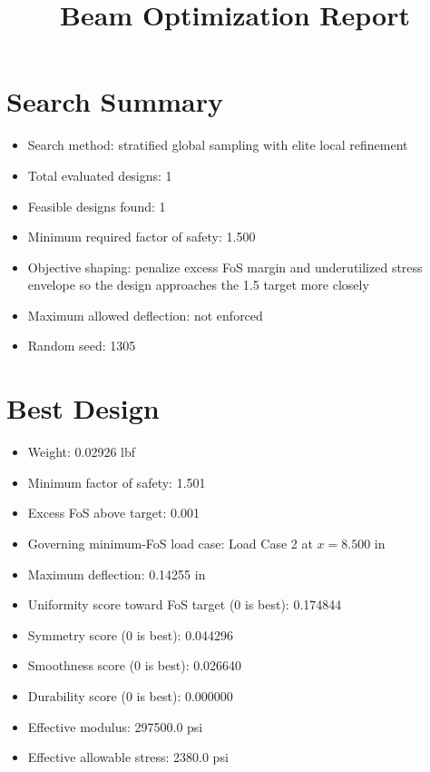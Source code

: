 \documentclass[11pt]{article}
\title{Beam Optimization Report}
\date{}
\begin{document}
\maketitle

\section*{Search Summary}
\begin{itemize}
\item Search method: stratified global sampling with elite local refinement
\item Total evaluated designs: 1
\item Feasible designs found: 1
\item Minimum required factor of safety: 1.500
\item Objective shaping: penalize excess FoS margin and underutilized stress envelope so the design approaches the 1.5 target more closely
\item Maximum allowed deflection: not enforced
\item Random seed: 1305
\end{itemize}

\section*{Best Design}
\begin{itemize}
\item Weight: 0.02926 lbf
\item Minimum factor of safety: 1.501
\item Excess FoS above target: 0.001
\item Governing minimum-FoS load case: Load Case 2 at $x=8.500$ in
\item Maximum deflection: 0.14255 in
\item Uniformity score toward FoS target (0 is best): 0.174844
\item Symmetry score (0 is best): 0.044296
\item Smoothness score (0 is best): 0.026640
\item Durability score (0 is best): 0.000000
\item Effective modulus: 297500.0 psi
\item Effective allowable stress: 2380.0 psi
\end{itemize}
\end{document}
